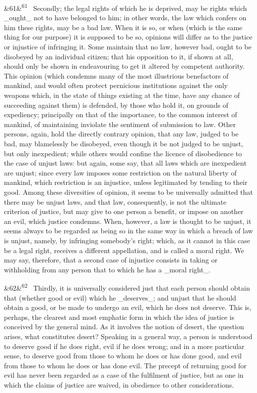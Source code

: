 \documentclass[12pt]{article}
\newcommand{\para}[1][]{\par\noindent\ifx&#1&\else\textsuperscript{\footnotesize #1}~\fi}
\begin{document}
\para[61] Secondly; the legal rights of which he is deprived, may be rights which \_ought\_ not to have belonged to him; in other words, the law which confers on him these rights, may be a bad law. When it is so, or when (which is the same thing for our purpose) it is supposed to be so, opinions will differ as to the justice or injustice of infringing it. Some maintain that no law, however bad, ought to be disobeyed by an individual citizen; that his opposition to it, if shown at all, should only be shown in endeavouring to get it altered by competent authority. This opinion (which condemns many of the most illustrious benefactors of mankind, and would often protect pernicious institutions against the only weapons which, in the state of things existing at the time, have any chance of succeeding against them) is defended, by those who hold it, on grounds of expediency; principally on that of the importance, to the common interest of mankind, of maintaining inviolate the sentiment of submission to law. Other persons, again, hold the directly contrary opinion, that any law, judged to be bad, may blamelessly be disobeyed, even though it be not judged to be unjust, but only inexpedient; while others would confine the licence of disobedience to the case of unjust laws: but again, some say, that all laws which are inexpedient are unjust; since every law imposes some restriction on the natural liberty of mankind, which restriction is an injustice, unless legitimated by tending to their good. Among these diversities of opinion, it seems to be universally admitted that there may be unjust laws, and that law, consequently, is not the ultimate criterion of justice, but may give to one person a benefit, or impose on another an evil, which justice condemns. When, however, a law is thought to be unjust, it seems always to be regarded as being so in the same way in which a breach of law is unjust, namely, by infringing somebody's right; which, as it cannot in this case be a legal right, receives a different appellation, and is called a moral right. We may say, therefore, that a second case of injustice consists in taking or withholding from any person that to which he has a \_moral right\_.

\para[62] Thirdly, it is universally considered just that each person should obtain that (whether good or evil) which he \_deserves\_; and unjust that he should obtain a good, or be made to undergo an evil, which he does not deserve. This is, perhaps, the clearest and most emphatic form in which the idea of justice is conceived by the general mind. As it involves the notion of desert, the question arises, what constitutes desert? Speaking in a general way, a person is understood to deserve good if he does right, evil if he does wrong; and in a more particular sense, to deserve good from those to whom he does or has done good, and evil from those to whom he does or has done evil. The precept of returning good for evil has never been regarded as a case of the fulfilment of justice, but as one in which the claims of justice are waived, in obedience to other considerations.
\end{document}
